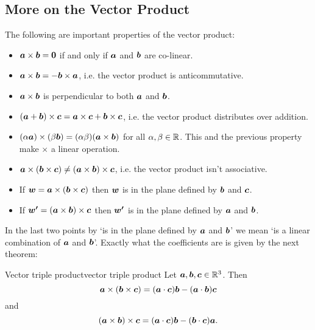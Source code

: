 \subsection{More on the Vector Product}
The following are important properties of the vector product:
\begin{itemize}
    \item \(\bm{a} \times \bm{b} = \bm{0}\) if and only if \(\bm{a}\) and \(\bm{b}\) are co-linear.
    \item \(\bm{a} \times \bm{b} = -\bm{b} \times \bm{a}\), i.e. the vector product is anticommutative.
    \item \(\bm{a} \times \bm{b}\) is perpendicular to both \(\bm{a}\) and \(\bm{b}\).
    \item \((\bm{a} + \bm{b})\times \bm{c} = \bm{a}\times\bm{c} + \bm{b}\times\bm{c}\), i.e. the vector product distributes over addition.
    \item \((\alpha\bm{a})\times(\beta\bm{b}) = (\alpha\beta)(\bm{a}\times\bm{b})\) for all \(\alpha, \beta\in\mathbb{R}\).
    This and the previous property make \(\times\) a linear operation.
    \item \(\bm{a}\times(\bm{b}\times\bm{c}) \ne (\bm{a}\times\bm{b})\times\bm{c}\), i.e. the vector product isn't associative.
    \item If \(\bm{w} = \bm{a} \times (\bm{b} \times \bm{c})\) then \(\bm{w}\) is in the plane defined by \(\bm{b}\) and \(\bm{c}\).
    \item If \(\bm{w'} = (\bm{a}\times\bm{b}) \times \bm{c}\) then \(\bm{w'}\) is in the plane defined by \(\bm{a}\) and \(\bm{b}\).
\end{itemize}
In the last two points by `is in the plane defined by \(\bm{a}\) and \(\bm{b}\)' we mean `is a linear combination of \(\bm{a}\) and \(\bm{b}\)'.
Exactly what the coefficients are is given by the next theorem:
\begin{theorem}{Vector triple product}{vector triple product}
    Let \(\bm{a}, \bm{b}, \bm{c} \in \mathbb{R}^3\).
    Then
    \[\bm{a}\times(\bm{b}\times\bm{c}) = (\bm{a}\cdot\bm{c})\bm{b} - (\bm{a}\cdot\bm{b})\bm{c}\]
    and
    \[(\bm{a}\times\bm{b})\times\bm{c} = (\bm{a}\cdot\bm{c})\bm{b} - (\bm{b}\cdot\bm{c})\bm{a}.\]
\end{theorem}

